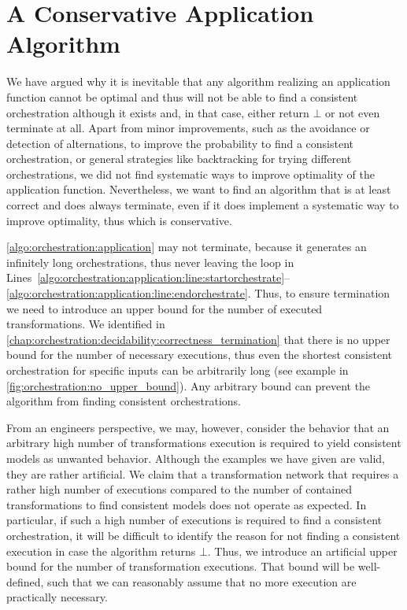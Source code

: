 \section{A Conservative Application Algorithm}

We have argued why it is inevitable that any algorithm realizing an application function cannot be optimal and thus will not be able to find a consistent orchestration although it exists and, in that case, either return $\bot$ or not even terminate at all.
Apart from minor improvements, such as the avoidance or detection of alternations, to improve the probability to find a consistent orchestration, or general strategies like backtracking for trying different orchestrations, we did not find systematic ways to improve optimality of the application function.
Nevertheless, we want to find an algorithm that is at least correct and does always terminate, even if it does implement a systematic way to improve optimality, thus which is conservative.

\autoref{algo:orchestration:application} may not terminate, because it generates an infinitely long orchestrations, thus never leaving the loop in Lines~\ref{algo:orchestration:application:line:startorchestrate}--\ref{algo:orchestration:application:line:endorchestrate}.
Thus, to ensure termination we need to introduce an upper bound for the number of executed transformations.
We identified in \autoref{chap:orchestration:decidability:correctness_termination} that there is no upper bound for the number of necessary executions, thus even the shortest consistent orchestration for specific inputs can be arbitrarily long (see example in \autoref{fig:orchestration:no_upper_bound}).
Any arbitrary bound can prevent the algorithm from finding consistent orchestrations.

From an engineers perspective, we may, however, consider the behavior that an arbitrary high number of transformations execution is required to yield consistent models as unwanted behavior.
Although the examples we have given are valid, they are rather artificial.
We claim that a transformation network that requires a rather high number of executions compared to the number of contained transformations to find consistent models does not operate as expected.
In particular, if such a high number of executions is required to find a consistent orchestration, it will be difficult to identify the reason for not finding a consistent execution in case the algorithm returns $\bot$.
Thus, we introduce an artificial upper bound for the number of transformation executions.
That bound will be well-defined, such that we can reasonably assume that no more execution are practically necessary.

